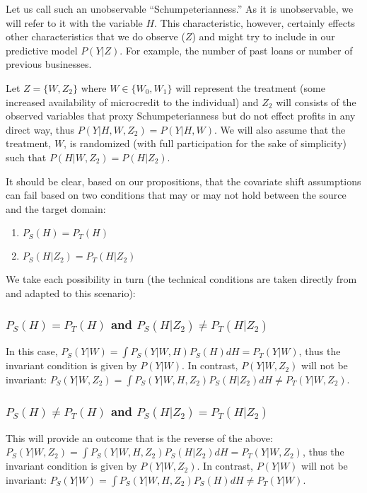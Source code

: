 \documentclass[a4paper,12pt]{article}
\begin{document}
Let us call such an unobservable ``Schumpeterianness.'' As it is unobservable, we will refer to it with the variable $H$. This characteristic, however, certainly effects other characteristics that we do observe ($Z$) and might try to include in our predictive model $P(Y|Z)$. For example, the number of past loans or number of previous businesses.

Let $Z = \{ W, Z_2 \}$ where $W \in \{ W_0, W_1\}$ will represent the treatment (some increased availability of microcredit to the individual) and $Z_2$ will consists of the observed variables that proxy Schumpeterianness but do not effect profits in any direct way, thus $P(Y|H,W,Z_2) = P(Y|H,W)$. We will also assume that the treatment, $W$, is randomized (with full participation for the sake of simplicity) such that $P(H|W,Z_2) = P(H|Z_2)$.

It should be clear, based on our propositions, that the covariate shift assumptions can fail based on two conditions that may or may not hold between the source and the target domain:

\begin{enumerate}
\item $P_S(H) = P_T(H)$
\item $P_S(H|Z_2) = P_T(H|Z_2)$
\end{enumerate}

We take each possibility in turn (the technical conditions are taken directly from \cite{Pearl2014} and adapted to this scenario):

\subsubsection*{$P_S(H) = P_T(H)$ and $P_S(H|Z_2) \neq P_T(H|Z_2)$}

In this case, $P_S(Y|W) = \int P_S(Y|W,H)P_S(H) dH = P_T(Y|W)$, thus the invariant condition is given by $P(Y|W)$. In contrast, $P(Y|W,Z_2)$ will not be invariant: $P_S(Y|W,Z_2) = \int P_S(Y|W,H,Z_2)P_S(H|Z_2) dH \neq P_T(Y|W,Z_2)$.

\subsubsection*{$P_S(H) \neq P_T(H)$ and $P_S(H|Z_2) = P_T(H|Z_2)$}

This will provide an outcome that is the reverse of the above: $P_S(Y|W,Z_2) = \int P_S(Y|W,H,Z_2)P_S(H|Z_2) dH = P_T(Y|W,Z_2)$, thus the invariant condition is given by $P(Y|W,Z_2)$. In contrast, $P(Y|W)$ will not be invariant: $P_S(Y|W) = \int P_S(Y|W,H,Z_2)P_S(H) dH \neq P_T(Y|W)$.
\end{document}
